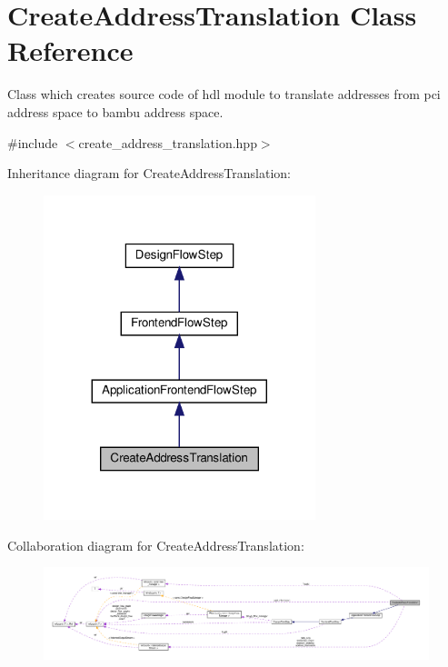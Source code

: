 \hypertarget{classCreateAddressTranslation}{}\section{Create\+Address\+Translation Class Reference}
\label{classCreateAddressTranslation}


Class which creates source code of hdl module to translate addresses from pci address space to bambu address space.  




{\ttfamily \#include $<$create\+\_\+address\+\_\+translation.\+hpp$>$}



Inheritance diagram for Create\+Address\+Translation\+:
\nopagebreak
\begin{figure}[H]
\begin{center}
\leavevmode
\includegraphics[width=224pt]{d9/d4e/classCreateAddressTranslation__inherit__graph}
\end{center}
\end{figure}


Collaboration diagram for Create\+Address\+Translation\+:
\nopagebreak
\begin{figure}[H]
\begin{center}
\leavevmode
\includegraphics[width=350pt]{d5/d92/classCreateAddressTranslation__coll__graph}
\end{center}
\end{figure}
